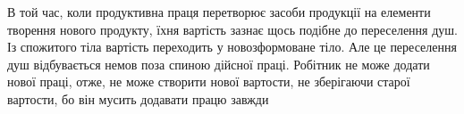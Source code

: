 В той час, коли продуктивна праця перетворює засоби продукції
на елементи творення нового продукту, їхня вартість зазнає
щось подібне до переселення душ. Із спожитого тіла вартість
переходить у новозформоване тіло. Але це переселення душ відбувається
немов поза спиною дійсної праці. Робітник не може
додати нової праці, отже, не може створити нової вартости, не
зберігаючи старої вартости, бо він мусить додавати працю завжди
\parbreak{}  %
